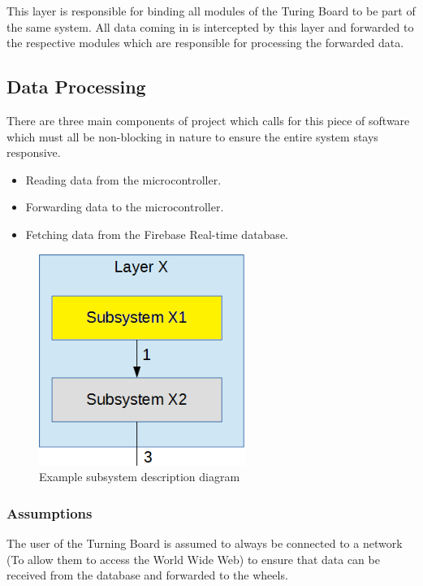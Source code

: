 This layer is responsible for binding all modules of the Turing Board to be part of the same system. All data coming in is intercepted by this layer and forwarded to the respective modules which are responsible for processing the forwarded data.

\subsection{Data Processing}
There are three main components of project which calls for this piece of software which must all be non-blocking in nature to ensure the entire system stays responsive.
\begin{itemize}
    \item Reading data from the microcontroller.
    \item Forwarding data to the microcontroller.
    \item Fetching data from the Firebase Real-time database.
\end{itemize}

\begin{figure}[h!]
	\centering
 	\includegraphics[width=0.60\textwidth]{images/subsystem}
 \caption{Example subsystem description diagram}
\end{figure}

\subsubsection{Assumptions}
The user of the Turning Board is assumed to always be connected to a network (To allow them to access the World Wide Web) to ensure that data can be received from the database and forwarded to the wheels.

